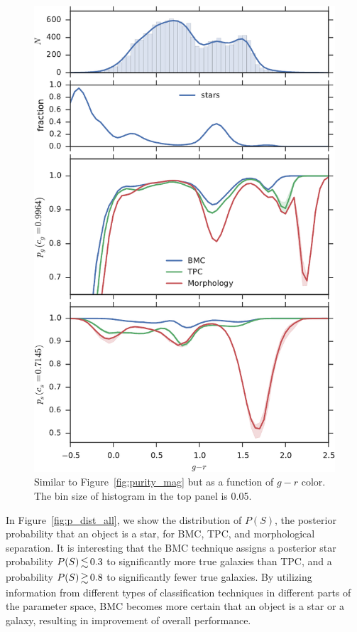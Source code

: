 \documentclass[useAMS,usenatbib]{mn2e}
\begin{document}
\begin{figure}
  \centering
  \includegraphics[width=\columnwidth]{figures/purity_g_r.pdf}
  \caption{Similar to Figure~\ref{fig:purity_mag}
           but as a function of $g-r$ color.
           The bin size of histogram in the top panel is 0.05.}
  \label{fig:purity_g_r}
\end{figure}


In Figure~\ref{fig:p_dist_all},
we show the distribution of $P(S)$,
the posterior probability that an object is a star,
for BMC, TPC, and morphological separation.
It is interesting that the BMC technique assigns
a posterior star probability $P(S) \la 0.3$
to significantly more true galaxies than TPC,
and a probability $P(S) \ga 0.8$ to significantly fewer true galaxies.
By utilizing information from different types of classification techniques
in different parts of the parameter space,
BMC becomes more certain that an object is a star or a galaxy,
resulting in improvement of overall performance.
\end{document}
